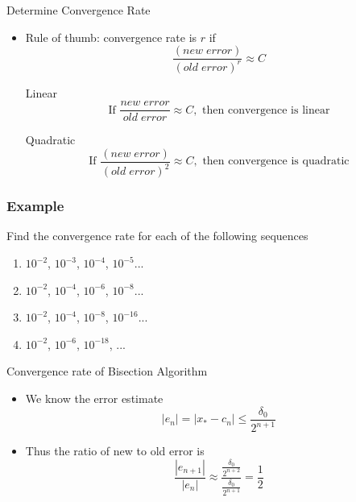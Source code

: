 \documentclass[10pt]{beamer}
\begin{document}
\begin{frame}{Determine Convergence Rate}
\begin{itemize}

    \item Rule of thumb: convergence rate is $r$ if
        $$\frac{(new\; error)}{(old\; error)^r} \approx C$$
    \begin{block}{Linear}
    $$ \text{If } \frac{new\; error}{old\; error}\approx C, \text{ then convergence is linear}$$
    \end{block}
    \begin{block}{Quadratic}
    $$ \text{If } \frac{(new\; error)}{(old\; error)^2}\approx C, \text{ then convergence is quadratic}$$
    \end{block}
        
\end{itemize}
    
\end{frame}
\begin{frame}
\frametitle{Example}
\begin{example}
Find the convergence rate for each of the following sequences
\begin{enumerate}
\item $10^{-2}$, $10^{-3}$, $10^{-4}$, $10^{-5}$... 
\item $10^{-2}$, $10^{-4}$, $10^{-6}$, $10^{-8}$... 
\item $10^{-2}$, $10^{-4}$, $10^{-8}$, $10^{-16}$...
\item $10^{-2}$, $10^{-6}$, $10^{-18}$, ... 
\end{enumerate}
\end{example}
\vspace{6mm}
\end{frame}
\begin{frame}{Convergence rate of Bisection Algorithm}
\begin{itemize}
    \item We know the error estimate 
\[ |e_n| = |x_{*} - c_n | \le \frac{\delta_0}{2^{n+1}}  \]
\item Thus the ratio of new to old error is 
\[
\frac{|e_{n+1}|}{|e_n|} \approx \frac{\frac{\delta_0}{2^{n+2}} }{\frac{\delta_0}{2^{n+1}} } = \frac{1}{2}
\]
\end{itemize}


\end{frame}
\end{document}
